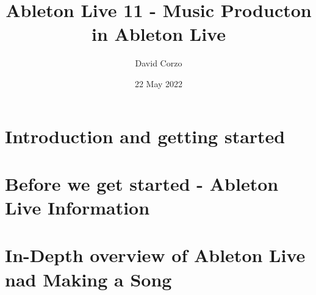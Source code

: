 \documentclass[openany]{book}
\title{Ableton Live 11 - Music Producton in Ableton Live}
\date{22 May 2022}
\author{David Corzo}
\begin{document}
\maketitle
\tableofcontents

\chapter{Introduction and getting started}


\chapter{Before we get started - Ableton Live Information}


\chapter{In-Depth overview of Ableton Live nad Making a Song}


\end{document}

